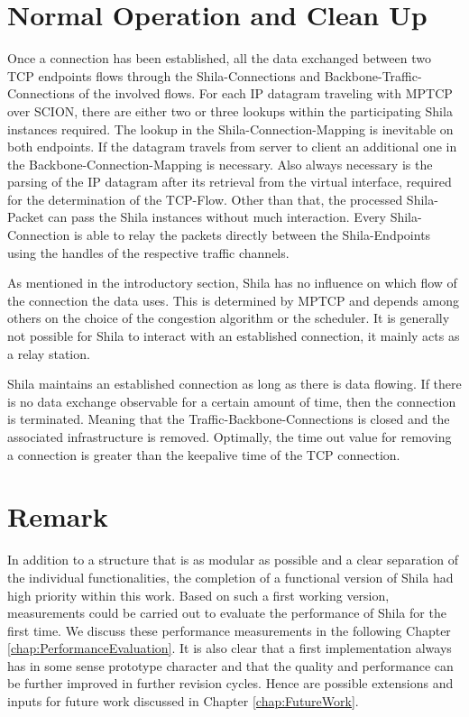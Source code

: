 \section{Normal Operation and Clean Up}
\label{sec:ImplementationNormalOperationAndCleanUp}

Once a connection has been established, all the data exchanged between two TCP endpoints flows through the Shila-Connections and Backbone-Traffic-Connections of the involved flows. For each IP datagram traveling with MPTCP over SCION, there are either two or three lookups within the participating Shila instances required. The lookup in the Shila-Connection-Mapping is inevitable on both endpoints. If the datagram travels from server to client an additional one in the Backbone-Connection-Mapping is necessary. Also always necessary is the parsing of the IP datagram after its retrieval from the virtual interface, required for the determination of the TCP-Flow. Other than that, the processed Shila-Packet can pass the Shila instances without much interaction. Every Shila-Connection is able to relay the packets directly between the Shila-Endpoints using the handles of the respective traffic channels.

As mentioned in the introductory section, Shila has no influence on which flow of the connection the data uses. This is determined by MPTCP and depends among others on the choice of the congestion algorithm or the scheduler. It is generally not possible for Shila to interact with an established connection, it mainly acts as a relay station.

Shila maintains an established connection as long as there is data flowing. If there is no data exchange observable for a certain amount of time, then the connection is terminated. Meaning that the Traffic-Backbone-Connections is closed and the associated infrastructure is removed. Optimally, the time out value for removing a connection is greater than the keepalive time \cite{KeepaliveWiki} of the TCP connection.

\section{Remark}

In addition to a structure that is as modular as possible and a clear separation of the individual functionalities, the completion of a functional version of Shila had high priority within this work. Based on such a first working version, measurements could be carried out to evaluate the performance of Shila for the first time. We discuss these performance measurements in the following Chapter \ref{chap:PerformanceEvaluation}. It is also clear that a first implementation always has in some sense prototype character and that the quality and performance can be further improved in further revision cycles. Hence are possible extensions and inputs for future work discussed in Chapter \ref{chap:FutureWork}.